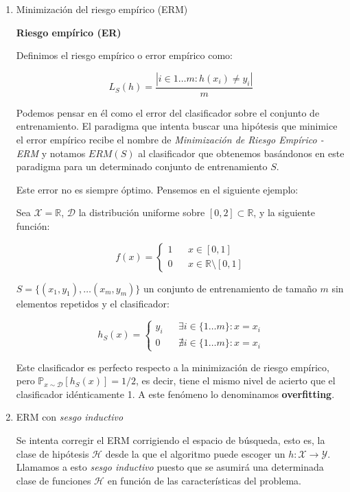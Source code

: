 \begin{enumerate}
\item Minimización del riesgo empírico (ERM)
\label{sec-3-4-1-1}

\begin{definition}
\textbf{Riesgo empírico (ER)}

Definimos el riesgo empírico o error empírico como:

\[L_S(h) = \frac{|i\in {1\ldots m}: h(x_i) \neq y_i|}{m}\]
\end{definition}

Podemos pensar en él como el error del clasificador sobre el conjunto de entrenamiento. El paradigma que intenta buscar una hipótesis que minimice el error empírico recibe el nombre de \emph{Minimización de Riesgo Empírico - ERM} y notamos $ERM(S)$ al clasificador que obtenemos basándonos en este paradigma para un determinado conjunto de entrenamiento $S$.

Este error no es siempre óptimo. Pensemos en el siguiente ejemplo:

Sea $\mathcal{X} = \mathbb{R}$, $\mathcal{D}$ la distribución uniforme sobre $[0,2]\subset \mathbb{R}$, y la siguiente función:

\[f(x) = \left\{\begin{array}{lcl}
1 && x\in [0,1]\\
0 && x\in \mathbb{R}\setminus [0,1]
\end{array}\right.\]


$S = \{(x_1,y_1), \ldots (x_m, y_m)\}$ un conjunto de entrenamiento de tamaño $m$ sin elementos repetidos y el clasificador:

\[h_S(x) = \left\{\begin{array}{lcl}
y_i && \exists i\in \{1\ldots m\} : x=x_i\\
0 && \nexists i\in \{1\ldots m\} : x=x_i
\end{array}\right.\]

Este clasificador es perfecto respecto a la minimización de riesgo empírico, pero $\mathbb{P}_{x\sim \mathcal{D}}[h_S(x)] = 1/2$, es decir, tiene el mismo nivel de acierto que el clasificador idénticamente 1. A este fenómeno lo denominamos \textbf{overfitting}.

\item ERM con \emph{sesgo inductivo}
\label{sec-3-4-1-2}

Se intenta corregir el ERM corrigiendo el espacio de búsqueda, esto es, la clase de hipótesis $\mathcal{H}$ desde la que el algoritmo puede escoger un $h: \mathcal{X}\rightarrow \mathcal{Y}$. Llamamos a esto \emph{sesgo inductivo} puesto que se asumirá una determinada clase de funciones $\mathcal{H}$ en función de las características del problema.


\end{enumerate}
